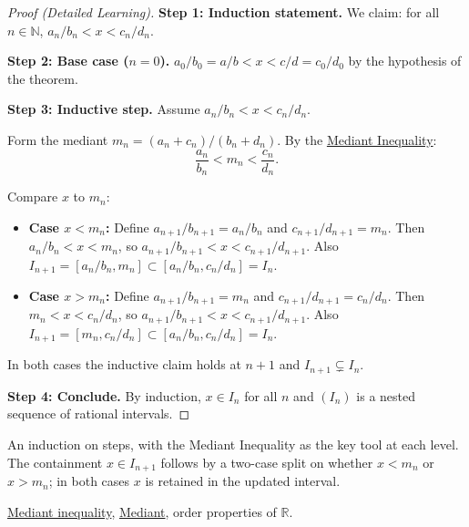 \begin{proof}[Proof (Detailed Learning)]
\textbf{Step 1: Induction statement.}
We claim: for all $n \in \mathbb{N}$, $a_n/b_n < x < c_n/d_n$.

\textbf{Step 2: Base case ($n = 0$).}
$a_0/b_0 = a/b < x < c/d = c_0/d_0$ by the hypothesis of the theorem.

\textbf{Step 3: Inductive step.}
Assume $a_n/b_n < x < c_n/d_n$.

Form the mediant $m_n = (a_n + c_n)/(b_n + d_n)$.  By the
\hyperref[thm:mediant-inequality]{Mediant Inequality}:
\[
\frac{a_n}{b_n} < m_n < \frac{c_n}{d_n}.
\]

Compare $x$ to $m_n$:
\begin{itemize}
  \item \textbf{Case $x < m_n$:} Define $a_{n+1}/b_{n+1} = a_n/b_n$ and
        $c_{n+1}/d_{n+1} = m_n$.  Then $a_n/b_n < x < m_n$, so
        $a_{n+1}/b_{n+1} < x < c_{n+1}/d_{n+1}$.  Also
        $I_{n+1} = [a_n/b_n, m_n] \subset [a_n/b_n, c_n/d_n] = I_n$.
  \item \textbf{Case $x > m_n$:} Define $a_{n+1}/b_{n+1} = m_n$ and
        $c_{n+1}/d_{n+1} = c_n/d_n$.  Then $m_n < x < c_n/d_n$, so
        $a_{n+1}/b_{n+1} < x < c_{n+1}/d_{n+1}$.  Also
        $I_{n+1} = [m_n, c_n/d_n] \subset [a_n/b_n, c_n/d_n] = I_n$.
\end{itemize}
In both cases the inductive claim holds at $n+1$ and $I_{n+1} \subsetneq I_n$.

\textbf{Step 4: Conclude.}
By induction, $x \in I_n$ for all $n$ and $(I_n)$ is a nested sequence of
rational intervals.
\end{proof}

\begin{remark*}
An induction on steps, with the Mediant Inequality as the key tool at each
level.  The containment $x \in I_{n+1}$ follows by a two-case split on
whether $x < m_n$ or $x > m_n$; in both cases $x$ is retained in the
updated interval.
\end{remark*}

\begin{dependencies}
\hyperref[thm:mediant-inequality]{Mediant inequality},
\hyperref[def:mediant]{Mediant},
order properties of $\mathbb{R}$.
\end{dependencies}
